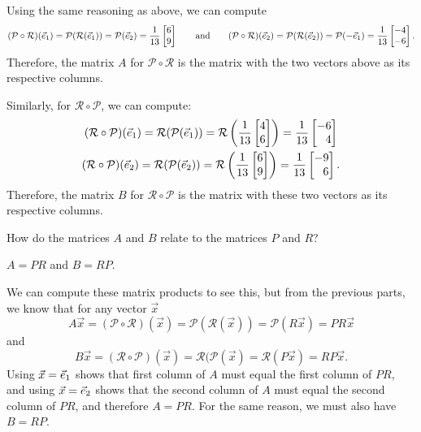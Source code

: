 \begin{parts}
\begin{solution}
				Using the same reasoning as above, we can compute
				\[
					(\mathcal P\circ\mathcal R)(\xhat)
					=\mathcal P(\mathcal R(\xhat))
					=\mathcal P(\yhat)
					=\frac{1}{13}\mat{6\\9}
					\qquad \text{and} \qquad
					(\mathcal P\circ\mathcal R)(\yhat)
					=\mathcal P(\mathcal R(\yhat))
					=\mathcal P(-\xhat)
					=\frac{1}{13}\mat{-4\\-6}.
				\]
				Therefore, the matrix $A$ for $\mathcal P\circ\mathcal R$ is the
				matrix with the two vectors above as its respective columns.

				Similarly, for $\mathcal R\circ \mathcal P$, we can compute:
				\begin{gather*}
					(\mathcal R\circ\mathcal P)(\xhat)
					=\mathcal R(\mathcal P(\xhat))
					=\mathcal R\left(\frac{1}{13}\mat{4\\6}\right)
					=\frac{1}{13}\mat{-6\\4} \\
					(\mathcal R\circ\mathcal P)(\yhat)
					=\mathcal R(\mathcal P(\yhat))
					=\mathcal R\left(\frac{1}{13}\mat{6\\9}\right)
					=\frac{1}{13}\mat{-9\\6}.
				\end{gather*}
				Therefore, the matrix $B$ for $\mathcal R\circ\mathcal P$ is the
				matrix with these two vectors as its respective columns.
			\end{solution}
		\item How do the matrices $A$ and $B$ relate to the matrices $P$ and $R$?
			\begin{solution}
				$A = PR$ and $B = RP$.

				We can compute these matrix products to see this, but
				from the previous parts, we know that for any vector $\vec x$
				\[
					A\vec x
					=(\mathcal P\circ\mathcal R)(\vec x)
					=\mathcal P(\mathcal R(\vec x))
					=\mathcal P(R\vec x)
					=PR\vec x
				\]
				and
				\[
					B\vec x
					=(\mathcal R\circ\mathcal P)(\vec x)
					=\mathcal R(\mathcal P(\vec x)
					=\mathcal R(P\vec x)
					=RP\vec x.
				\]
				Using $\vec x = {\vec e_1}$ shows that first column of $A$ must equal
				the first column of $PR$, and using $\vec x = {\vec e_2}$ shows that
				the second column of $A$ must equal the second column of $PR$,
				and therefore $A = PR$. For the same reason, we must also have $B=RP$.
			\end{solution}

	\end{parts}

